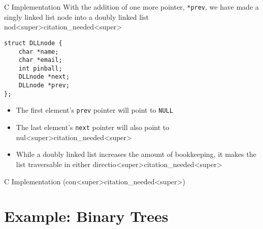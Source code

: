 \documentclass[11pt]{beamer}
\begin{document}
\begin{frame}[fragile=singleslide]{C Implementation}
With the addition of one more pointer, \texttt{*prev}, we have made a singly linked list node into a doubly linked list nod<super>citation_needed<super>
\begin{lstlisting}[style=C]
struct DLLnode {
	char *name;
	char *email;
	int pinball;
	DLLnode *next;
	DLLnode *prev;
};
\end{lstlisting} 
\begin{itemize}
\item The first element's \texttt{prev} pointer will point to \texttt{NULL}
\item The last element's \texttt{next} pointer will also point to nul<super>citation_needed<super>
\item While a doubly linked list increases the amount of bookkeeping, it makes the list traversable in either directio<super>citation_needed<super>  
\end{itemize}
\end{frame}

\begin{frame}{C Implementation (con<super>citation_needed<super>)}
\center
\
\end{frame}

\section[Trees]{Example: Binary Trees}
\end{document}

